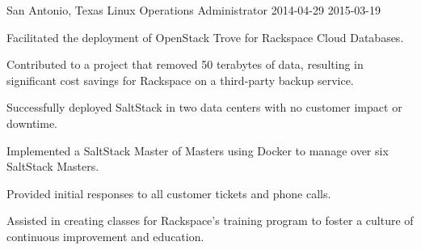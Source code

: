 \begin{role}
{\companyrackspace}
{San Antonio, Texas}
{Linux Operations Administrator }
{2014-04-29}
{2015-03-19}
    \item Facilitated the deployment of OpenStack Trove for Rackspace Cloud Databases.
    \item Contributed to a project that removed 50 terabytes of data, resulting in significant cost savings for Rackspace on a third-party backup service.
    \item Successfully deployed SaltStack in two data centers with no customer impact or downtime.
    \item Implemented a SaltStack Master of Masters using Docker to manage over six SaltStack Masters.
    \item Provided initial responses to all customer tickets and phone calls.
    \item Assisted in creating classes for Rackspace's training program to foster a culture of continuous improvement and education.
\end{role}
